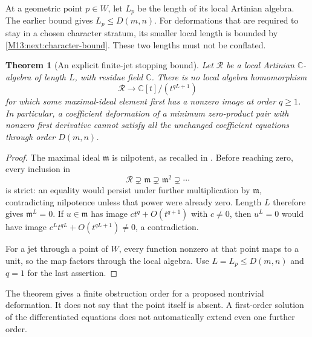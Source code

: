 \documentclass[11pt,a4paper,oneside]{report}
\newtheorem{theorem}{Theorem}[section]
\theoremstyle{definition}
\theoremstyle{remark}
\newcommand{\C}{\mathbb C}
\begin{document}
At a geometric point $p\in W$, let $L_p$ be the length of its local
Artinian algebra. The earlier bound gives $L_p\le D(m,n)$.
For deformations that are required to stay in a chosen character
stratum, its smaller local length is bounded by
\eqref{M13:next:character-bound}. These two lengths must not be conflated.

\begin{theorem}[An explicit finite-jet stopping bound]
\label{M13:next:jet-stop}
Let $\mathcal R$ be a local Artinian $\C$-algebra of length $L$,
with residue field $\C$. There is no local algebra homomorphism
\[
 \mathcal R\longrightarrow\C[t]/(t^{qL+1})
\]
for which some maximal-ideal element first has a nonzero image
at order $q\ge1$. In particular, a coefficient deformation of a
minimum zero-product pair with nonzero first derivative cannot
satisfy all the unchanged coefficient equations through order
$D(m,n)$.
\end{theorem}
\begin{proof}
The maximal ideal $\mathfrak m$ is nilpotent, as recalled in
\cite[Lemma 10.53.4]{B:StacksArtinian}. Before reaching zero, every
inclusion in
\[
 \mathcal R\supsetneq\mathfrak m\supsetneq
 \mathfrak m^2\supsetneq\cdots
\]
is strict: an equality would persist under further multiplication
by $\mathfrak m$, contradicting nilpotence unless that power were
already zero. Length $L$ therefore gives $\mathfrak m^L=0$.
If $u\in\mathfrak m$ has image $ct^q+O(t^{q+1})$ with $c\ne0$,
then $u^L=0$ would have image
$c^Lt^{qL}+O(t^{qL+1})\ne0$, a contradiction.

For a jet through a point of $W$, every function nonzero at that
point maps to a unit, so the map factors through the local algebra.
Use $L=L_p\le D(m,n)$ and $q=1$ for the last assertion.
\end{proof}

The theorem gives a finite obstruction order for a proposed
nontrivial deformation. It does not say that the point itself is
absent. A first-order solution of the differentiated equations
does not automatically extend even one further order.
\end{document}
